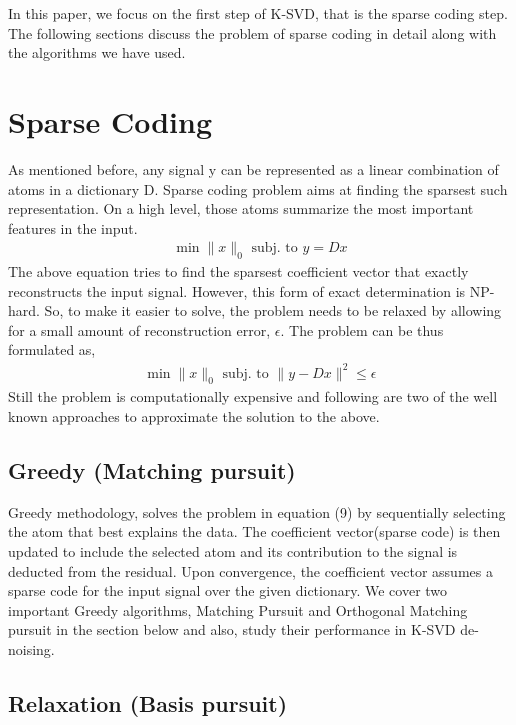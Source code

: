 \documentclass{article} %
\begin{document}
In this paper, we focus on the first step of K-SVD, that is the sparse coding step. The following sections discuss the problem of sparse coding in detail along with the algorithms we have used.
\section{Sparse Coding}
As mentioned before, any signal y can be represented as a linear combination of atoms in a dictionary D. Sparse coding problem aims at finding the sparsest such representation. On a high level, those atoms summarize the most important features in the input.\\
\begin{align}
\min\|x\|_0  \text{ subj. to } y=Dx
\end{align}
The above equation tries to find the sparsest coefficient vector that exactly reconstructs the input signal. However, this form of exact determination is NP-hard. So, to make it easier to solve, the problem needs to be relaxed by allowing for a small amount of reconstruction error, $\epsilon$. The problem can be thus formulated as,\\
\begin{align}
\min\|x\|_0  \text{ subj. to } \|y-Dx\|^2 \leq \epsilon
\end{align}
Still the problem is computationally expensive and following are two of the well known approaches to approximate the solution to the above.



\subsection{Greedy (Matching pursuit)}
Greedy methodology, solves the problem in equation (9) by sequentially selecting the atom that best explains the data. The coefficient vector(sparse code) is then updated to include the selected atom and its contribution to the signal is deducted from the residual. Upon convergence, the coefficient vector assumes a sparse code for the input signal over the given dictionary. We cover two important Greedy algorithms, Matching Pursuit and Orthogonal Matching pursuit in the section below and also, study their performance in K-SVD de-noising.

\subsection{Relaxation (Basis pursuit)}
\end{document}
